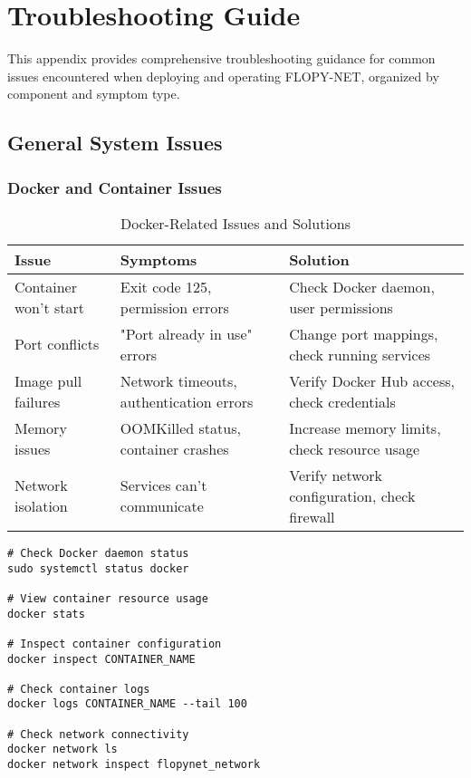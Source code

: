 \section{Troubleshooting Guide}
\label{appendix:troubleshooting}

This appendix provides comprehensive troubleshooting guidance for common issues encountered when deploying and operating FLOPY-NET, organized by component and symptom type.

\subsection{General System Issues}

\subsubsection{Docker and Container Issues}

\begin{table}[H]
\centering
\caption{Docker-Related Issues and Solutions}
\label{tab:docker-issues}
\begin{tabularx}{\textwidth}{@{}lXX@{}}
\toprule
\textbf{Issue} & \textbf{Symptoms} & \textbf{Solution} \\
\midrule
Container won't start & Exit code 125, permission errors & Check Docker daemon, user permissions \\
Port conflicts & "Port already in use" errors & Change port mappings, check running services \\
Image pull failures & Network timeouts, authentication errors & Verify Docker Hub access, check credentials \\
Memory issues & OOMKilled status, container crashes & Increase memory limits, check resource usage \\
Network isolation & Services can't communicate & Verify network configuration, check firewall \\
\bottomrule
\end{tabularx}
\end{table}

\begin{lstlisting}[style=bashcode, caption=Docker Troubleshooting Commands]
# Check Docker daemon status
sudo systemctl status docker

# View container resource usage
docker stats

# Inspect container configuration
docker inspect CONTAINER_NAME

# Check container logs
docker logs CONTAINER_NAME --tail 100

# Check network connectivity
docker network ls
docker network inspect flopynet_network
\end{lstlisting}

